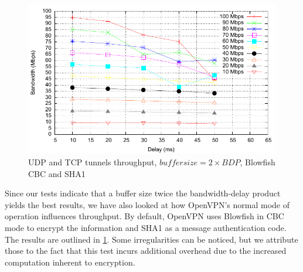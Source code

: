 \begin{figure}
  \centering
  \includegraphics[width=\textwidth]{img/test-mptcp-2-crypto}
  \caption{UDP and TCP tunnels throughput, $buffer size = 2 \times BDP$, Blowfish CBC and SHA1}
  \label{fig:mptcp-2-crypto}
\end{figure}

Since our tests indicate that a buffer size twice the bandwidth-delay product
yields the best results, we have also looked at how OpenVPN's normal mode of
operation influences throughput. By default, OpenVPN uses Blowfish in CBC mode
to encrypt the information and SHA1 as a message authentication code. The
results are outlined in \ref{fig:mptcp-2-crypto}. Some irregularities can be
noticed, but we attribute those to the fact that this test incurs additional
overhead due to the increased computation inherent to encryption.

